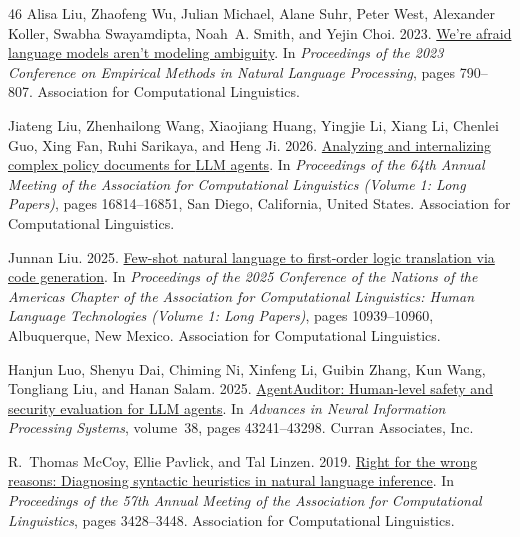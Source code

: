 \documentclass[11pt]{article}
\begin{document}
\begin{thebibliography}{46}
Alisa Liu, Zhaofeng Wu, Julian Michael, Alane Suhr, Peter West, Alexander Koller, Swabha Swayamdipta, Noah~A. Smith, and Yejin Choi. 2023.
\newblock \href {https://doi.org/10.18653/v1/2023.emnlp-main.51} {We're afraid language models aren't modeling ambiguity}.
\newblock In \emph{Proceedings of the 2023 Conference on Empirical Methods in Natural Language Processing}, pages 790--807. Association for Computational Linguistics.

Jiateng Liu, Zhenhailong Wang, Xiaojiang Huang, Yingjie Li, Xiang Li, Chenlei Guo, Xing Fan, Ruhi Sarikaya, and Heng Ji. 2026.
\newblock \href {https://doi.org/10.18653/v1/2026.acl-long.767} {Analyzing and internalizing complex policy documents for {LLM} agents}.
\newblock In \emph{Proceedings of the 64th Annual Meeting of the Association for Computational Linguistics (Volume 1: Long Papers)}, pages 16814--16851, San Diego, California, United States. Association for Computational Linguistics.

Junnan Liu. 2025.
\newblock \href {https://doi.org/10.18653/v1/2025.naacl-long.547} {Few-shot natural language to first-order logic translation via code generation}.
\newblock In \emph{Proceedings of the 2025 Conference of the Nations of the Americas Chapter of the Association for Computational Linguistics: Human Language Technologies (Volume 1: Long Papers)}, pages 10939--10960, Albuquerque, New Mexico. Association for Computational Linguistics.

Hanjun Luo, Shenyu Dai, Chiming Ni, Xinfeng Li, Guibin Zhang, Kun Wang, Tongliang Liu, and Hanan Salam. 2025.
\newblock \href {https://doi.org/10.52202/085713-1440} {{AgentAuditor}: Human-level safety and security evaluation for {LLM} agents}.
\newblock In \emph{Advances in Neural Information Processing Systems}, volume~38, pages 43241--43298. Curran Associates, Inc.

R.~Thomas McCoy, Ellie Pavlick, and Tal Linzen. 2019.
\newblock \href {https://doi.org/10.18653/v1/P19-1334} {Right for the wrong reasons: Diagnosing syntactic heuristics in natural language inference}.
\newblock In \emph{Proceedings of the 57th Annual Meeting of the Association for Computational Linguistics}, pages 3428--3448. Association for Computational Linguistics.


\end{thebibliography}
\end{document}
